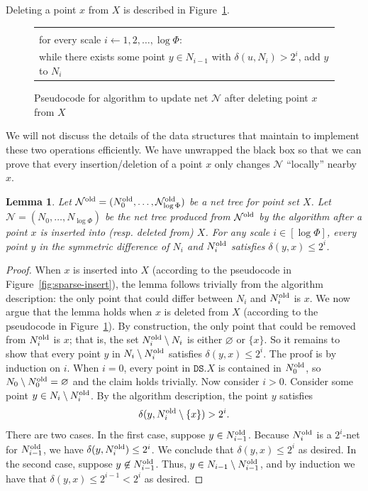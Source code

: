 \documentclass[11pt]{article}
\makeatletter
\def\set#1{\{ #1 \}}
\def\begin@lgo{\begin{minipage}{1in}\small\begin{tabbing}
        \quad\=\qquad\=\qquad\=\qquad\=\qquad\=\qquad\=\qquad\=\qquad\=\qquad\=\qquad\=\qquad\=\qquad\=\qquad\=\kill}
\def\end@lgo{\end{tabbing}\end{minipage}}
\newenvironment{algorithm}
{\begin{tabular}{|l|}\hline\begin@lgo}
{\end@lgo\\\hline\end{tabular}}
\newtheorem{lemma}[theorem]{Lemma}
\newcommand{\cN}{\mathcal{N}}
\newcommand{\dist}{\ensuremath{\delta}}
\newcommand{\DS}{\texttt{DS}}
\newcommand{\points}{{\ensuremath{\DS.X}}}
\makeatother
\begin{document}
%
\noindent Deleting a point $x$ from $X$ is described in Figure~\ref{fig:sparse-delete}.
\begin{figure}[h!]
    \centering
    \begin{algorithm}
    update $\cN$ by deleting $x$ from every net $N_i \in \cN$
    \\ for every scale $i \gets 1, 2, \ldots, \log \Phi$:\+
    \\      while there exists some point $y \in N_{i-1}$ with $\dist(u, N_{i}) > 2^i$, add $y$ to $N_i$\-
    \end{algorithm}
    \caption{Pseudocode for \cite{gao2004deformable} algorithm to update net $\mathcal{N}$ after deleting point $x$ from $X$}
    \label{fig:sparse-delete}
\end{figure}
%
We will not discuss the details of the data structures that \cite{gao2004deformable} maintain to implement these two operations efficiently. We have unwrapped the \cite{gao2004deformable} black box so that we can prove that every insertion/deletion of a point $x$ only changes $\cN$ ``locally'' nearby $x$.
\begin{lemma}
\label{lem:net-delete-local}
Let $\cN^{\rm old} = (N_0^{\rm old}, \ldots, \cN_{\log \Phi}^{\rm old})$ be a net tree for point set $X$. Let $\cN = (N_0, \ldots, N_{\log \Phi})$ be the net tree produced from $\cN^{\rm old}$ by the \cite{gao2004deformable} algorithm after a point $x$ is inserted into (resp. deleted from) $X$. For any scale $i \in [\log \Phi]$, every point $y$ in the symmetric difference of $N_i$ and $N^{\rm old}_i$ satisfies $\dist(y,x) \le 2^i$.
\end{lemma}
\begin{proof}
When $x$ is inserted into $X$ (according to the pseudocode in Figure~\ref{fig:sparse-insert}), the lemma follows trivially from the \cite{gao2004deformable} algorithm description: the only point that could differ between $N_i$ and $N^{\rm old}_i$ is $x$. We now argue that the lemma holds when $x$ is deleted from $X$ (according to the pseudocode in Figure~\ref{fig:sparse-delete}).
    By construction, the only point that could be removed from $N_i^{\rm old}$ is $x$; that is, the set $N_i^{\rm old} \setminus N_i$ is either $\varnothing$ or $\set{x}$. So it remains to show that every point $y$ in $N_i \setminus N^{\rm old}_i$ satisfies $\dist(y,x) \le 2^i$.
% 
    The proof is by induction on $i$. When $i=0$, every point in $\points$ is contained in $N^{\rm old}_0$, so $N_0 \setminus N^{\rm old}_0 = \varnothing$ and the claim holds trivially. Now consider $i > 0$. Consider some point $y \in N_i \setminus N_i^{\rm old}$. By the algorithm description, the point $y$ satisfies
    \[\dist(y, N^{\rm old}_{i} \setminus \set{x}) > 2^i.\]
    There are two cases. In the first case, suppose $y \in N^{\rm old}_{i-1}$. Because $N^{\rm old}_{i}$ is a $2^i$-net for $N^{\rm old}_{i-1}$, we have $\dist(y, N^{\rm old}_i) \le 2^i$. We conclude that $\dist(y, x) \le 2^i$ as desired.
    In the second case, suppose $y \not \in N^{\rm old}_{i-1}$. Thus, $y \in N_{i-1} \setminus N^{\rm old}_{i-1}$, and by induction we have that $\dist(y, x) \le 2^{i-1} < 2^i$ as desired.
\end{proof}
\end{document}
